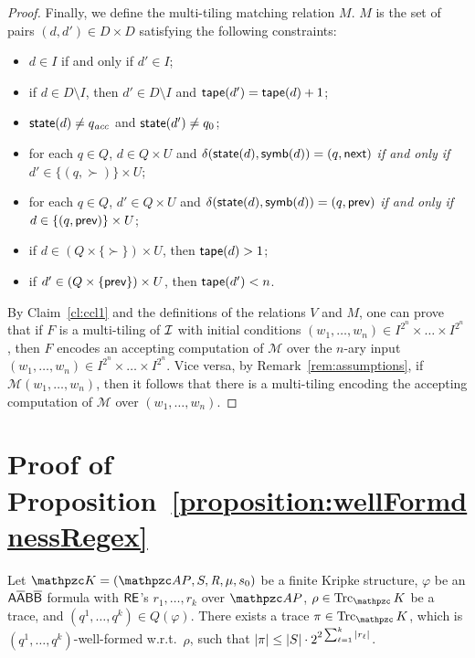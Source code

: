\begin{proof}
Finally, we define the multi-tiling matching relation $M$. $M$ is the set of pairs $(d,d')\in D\times D$ satisfying the following constraints:
\begin{itemize}
\item $d\in I$ if and only if $d'\in I$;
\item if $d\in D\setminus I$, then $d'\in D\setminus I$ and $\text{{\sffamily tape}}(d')=\text{{\sffamily tape}}(d)+1$;
\item $\text{{\sffamily state}}(d)\neq q_{\textit{acc}}$ and $\text{{\sffamily state}}(d')\neq q_0$;
\item for each $q\in Q$,   $d\in Q\times U$ and $\delta(\text{{\sffamily state}}(d),\text{{\sffamily symb}}(d))=(q,\text{{\sffamily next}})$ \emph{if and only if} $d'\in \{(q,\succ)\}\times U$;
\item for each $q\in Q$,   $d'\in Q\times U$ and $\delta(\text{{\sffamily state}}(d),\text{{\sffamily symb}}(d))=(q,\text{{\sffamily prev}})$ \emph{if and only if} $d\in \{(q,\text{{\sffamily prev}})\}\times U$;
\item if $d\in (Q \times \{\succ\})\times U$, then $\text{{\sffamily tape}}(d)>1$;
\item if $d'\in (Q \times \{\text{{\sffamily prev}}\})\times U$, then $\text{{\sffamily tape}}(d')<n$.
\end{itemize}

By Claim~\ref{cl:ccl1} and the definitions of the relations $V$ and $M$, one can prove that if $F$ is a multi-tiling of
$\mathcal{I}$ with initial conditions  $(w_1,\ldots,w_n)\in I^{2^{n}}\times \ldots \times I^{2^{n}}$, then $F$ encodes an accepting computation
of $\mathcal{M}$ over the $n$-ary input $(w_1,\ldots,w_n)\in I^{2^{n}}\times \ldots \times I^{2^{n}}$. Vice versa, by Remark~\ref{rem:assumptions},
if $\mathcal{M}(w_1,\ldots,w_n)$, then it follows that there is a multi-tiling encoding the accepting computation of $\mathcal{M}$ over
$(w_1,\ldots,w_n)$.
\end{proof}


\section{Proof of Proposition~\ref{proposition:wellFormdnessRegex}}\label{proof:proposition:wellFormdnessRegex}

\begin{proposition*}[\ref{proposition:wellFormdnessRegex}]
Let $\Ku=\KuDef$ be a finite Kripke structure, $\varphi$ be an $\mathsf{A\overline{A}B\overline{B}}$ formula  with $\mathsf{RE}$'s $r_1,\ldots ,r_k$ over $\Prop$, $\rho\in\Trk_\Ku$ be
a trace, and $(q^1,\ldots , q^k)\in Q(\varphi)$. There exists a trace $\pi\in\Trk_\Ku$, which is $(q^1,\ldots , q^k)$-well-formed w.r.t.\ $\rho$, such that $|\pi| \leq |S|\cdot 2^{2\sum^k_{\ell=1}|r_\ell|}$.
\end{proposition*}

